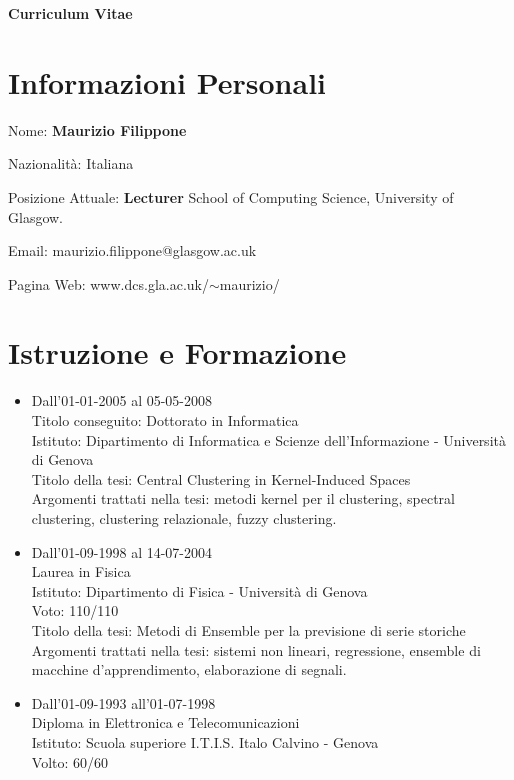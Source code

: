\documentclass[a4paper,10pt]{article}
\begin{document}
\begin{center}
{\bf \huge Curriculum Vitae}
\end{center}

\section*{Informazioni Personali}
\begin{description}
\item Nome:               {\bf Maurizio Filippone}
\item Nazionalit\`a:        Italiana
\item Posizione Attuale:
  {\bf Lecturer} School of Computing Science, University of Glasgow.
\item Email:              maurizio.filippone@glasgow.ac.uk
\item Pagina Web:         www.dcs.gla.ac.uk/$\sim$maurizio/
\end{description}

\section*{Istruzione e Formazione}
\begin{itemize}
\item Dall'01-01-2005 al 05-05-2008 \\
Titolo conseguito: Dottorato in Informatica \\
Istituto: Dipartimento di Informatica e Scienze dell'Informazione - Universit\`a di Genova \\
Titolo della tesi: Central Clustering in Kernel-Induced Spaces \\
Argomenti trattati nella tesi: metodi kernel per il clustering, spectral clustering, clustering relazionale, fuzzy clustering.

\item Dall'01-09-1998 al 14-07-2004  \\
Laurea in Fisica  \\
Istituto: Dipartimento di Fisica - Universit\`a di Genova \\
Voto: 110/110  \\
Titolo della tesi: Metodi di Ensemble per la previsione di serie storiche \\
Argomenti trattati nella tesi: sistemi non lineari, regressione, ensemble di macchine d'apprendimento, elaborazione di segnali.

\item Dall'01-09-1993 all'01-07-1998  \\
Diploma in Elettronica e Telecomunicazioni \\
Istituto: Scuola superiore I.T.I.S. Italo Calvino - Genova \\
Volto: 60/60

\end{itemize}
\end{document}
